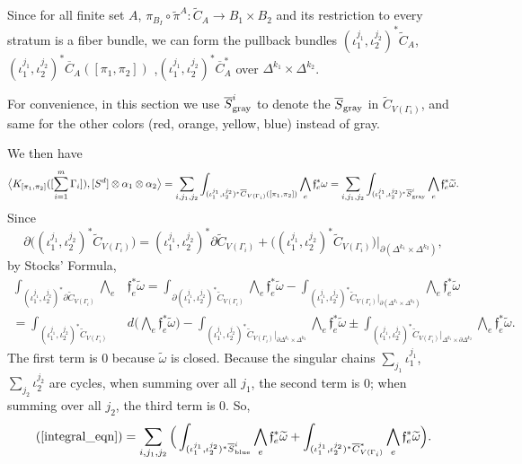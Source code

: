 \documentclass[11pt]{article}
\theoremstyle{definition}
\theoremstyle{remark}
\def\wt#1{\widetilde{#1}}
\def\ov#1{\overline{#1}}
\def\sgray{{\textnormal{gray}}}
\def\sblue{{\textnormal{blue}}}
\def\ff{\mathfrak{f}}
\begin{document}
Since for all finite set $A$,
$\pi_{B_I}\circ\tilde{\pi}^A:\wt{C}_A\to B_1\times B_2$
and its restriction to every stratum is a fiber bundle, 
we can form the pullback bundles $(\iota_1^{j_1},\iota_2^{j_2})^*\wt{C}_A$, $(\iota_1^{j_1},\iota_2^{j_2})^*\ov{C}_A([\pi_1,\pi_2])$ ,$(\iota_1^{j_1},\iota_2^{j_2})^*\ov{C}^*_A$ over $\Delta^{k_1}\times\Delta^{k_2}$. 

For convenience, in this section we use $\ov{S}_{\sgray}^i$ to denote the $\ov{S}_{\sgray}$ in $\wt{C}_{V(\Gamma_i)}$, and same for the other colors (red, orange, yellow, blue) instead of gray. 

We then have 
\begin{equation}
\label{integral_eqn}
\big\langle K_{[\pi_1,\pi_2]}([\sum_{i=1}^m\Gamma_i]), [S^d]\otimes\alpha_1\otimes\alpha_2 \big\rangle=
\sum_{i,j_1,j_2}\int_{(\iota_1^{j_1},\iota_2^{j_2})^*\ov{C}_{V(\Gamma_i)}([\pi_1,\pi_2])}\bigwedge_{e}\ff_e^*{\omega}=
\sum_{i,j_1,j_2}\int_{(\iota_1^{j_1},\iota_2^{j_2})^*\ov{S}_{\sgray}^i}\bigwedge_{e}\ff_e^*\wt{\omega}.
\end{equation}
Since 
\[
\partial\big((\iota_1^{j_1},\iota_2^{j_2})^*\wt{C}_{V(\Gamma_i)}\big)=(\iota_1^{j_1},\iota_2^{j_2})^*\partial\wt{C}_{V(\Gamma_i)}+\big((\iota_1^{j_1},\iota_2^{j_2})^*\wt{C}_{V(\Gamma_i)}\big)\big|_{\partial(\Delta^{k_1}\times\Delta^{k_2})}, 
\]
by Stocks' Formula, 
\begin{align*}
\int_{(\iota_1^{j_1},\iota_2^{j_2})^*\partial\wt{C}_{V(\Gamma_i)}}\bigwedge_{e}&\ff_e^*\wt{\omega}=
\int_{\partial(\iota_1^{j_1},\iota_2^{j_2})^*\wt{C}_{V(\Gamma_i)}}\bigwedge_{e}\ff_e^*\wt{\omega}-
\int_{(\iota_1^{j_1},\iota_2^{j_2})^*\wt{C}_{V(\Gamma_i)}|_{\partial(\Delta^{k_1}\times\Delta^{k_2})}}\bigwedge_{e}\ff_e^*\wt{\omega}\\
=\int_{(\iota_1^{j_1},\iota_2^{j_2})^*\wt{C}_{V(\Gamma_i)}}&d\Big(\bigwedge_{e}\ff_e^*\wt{\omega}\Big)-
\int_{(\iota_1^{j_1},\iota_2^{j_2})^*\wt{C}_{V(\Gamma_i)}|_{\partial\Delta^{k_1}\times\Delta^{k_2}}}\bigwedge_{e}\ff_e^*\wt{\omega}\pm
\int_{(\iota_1^{j_1},\iota_2^{j_2})^*\wt{C}_{V(\Gamma_i)}|_{\Delta^{k_1}\times\partial\Delta^{k_2}}}\bigwedge_{e}\ff_e^*\wt{\omega}.
\end{align*}
The first term is 0 because $\wt{\omega}$ is closed.  
Because the singular chains $\sum_{j_1}\iota_1^{j_1}$, $\sum_{j_2}\iota_2^{j_2}$ are cycles, when summing over all $j_1$, the second term is 0; when summing over all $j_2$, the third term is 0. 
So, 
$$(\ref{integral_eqn})=\sum_{i,j_1,j_2}\Big(\int_{(\iota_1^{j_1},\iota_2^{j_2})^*\ov{S}_{\sblue}^i}\bigwedge_{e}\ff_e^*\wt{\omega}+\int_{(\iota_1^{j_1},\iota_2^{j_2})^*\ov{C}^*_{V(\Gamma_i)}}\bigwedge_{e}\ff_e^*{\wt\omega}\Big).$$
\end{document}
